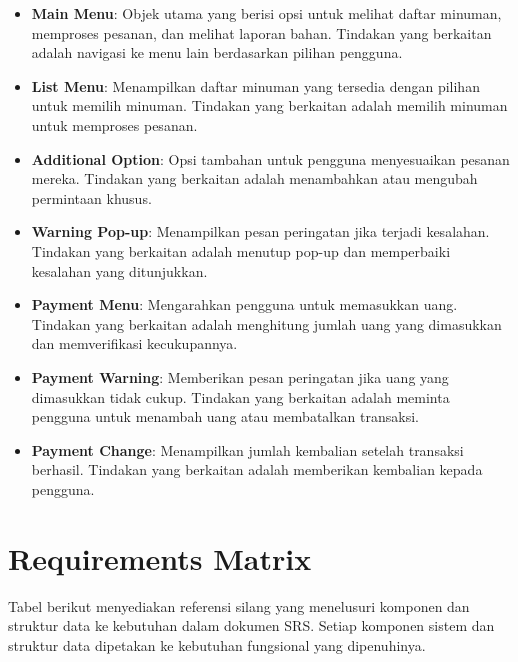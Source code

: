 \documentclass[12pt]{article}
\begin{document}
\begin{itemize}
    \item \textbf{Main Menu}: Objek utama yang berisi opsi untuk melihat daftar minuman, memproses pesanan, dan melihat laporan bahan. Tindakan yang berkaitan adalah navigasi ke menu lain berdasarkan pilihan pengguna.
    \item \textbf{List Menu}: Menampilkan daftar minuman yang tersedia dengan pilihan untuk memilih minuman. Tindakan yang berkaitan adalah memilih minuman untuk memproses pesanan.
    \item \textbf{Additional Option}: Opsi tambahan untuk pengguna menyesuaikan pesanan mereka. Tindakan yang berkaitan adalah menambahkan atau mengubah permintaan khusus.
    \item \textbf{Warning Pop-up}: Menampilkan pesan peringatan jika terjadi kesalahan. Tindakan yang berkaitan adalah menutup pop-up dan memperbaiki kesalahan yang ditunjukkan.
    \item \textbf{Payment Menu}: Mengarahkan pengguna untuk memasukkan uang. Tindakan yang berkaitan adalah menghitung jumlah uang yang dimasukkan dan memverifikasi kecukupannya.
    \item \textbf{Payment Warning}: Memberikan pesan peringatan jika uang yang dimasukkan tidak cukup. Tindakan yang berkaitan adalah meminta pengguna untuk menambah uang atau membatalkan transaksi.
    \item \textbf{Payment Change}: Menampilkan jumlah kembalian setelah transaksi berhasil. Tindakan yang berkaitan adalah memberikan kembalian kepada pengguna.
\end{itemize}

\section{Requirements Matrix}

Tabel berikut menyediakan referensi silang yang menelusuri komponen dan struktur data ke kebutuhan dalam dokumen SRS. Setiap komponen sistem dan struktur data dipetakan ke kebutuhan fungsional yang dipenuhinya.
\end{document}
